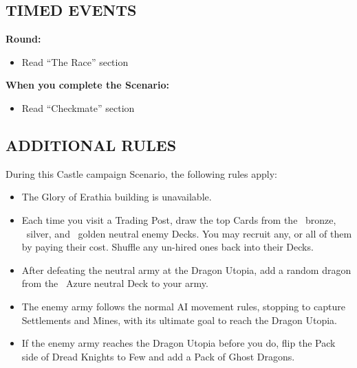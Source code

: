\begin{multicols}{2}

\subsection*{\MakeUppercase{Timed Events}}

\textbf{ Round:}
\begin{itemize}
  \item Read ``The Race'' section
\end{itemize}

\textbf{When you complete the Scenario:}
\begin{itemize}
  \item Read ``Checkmate'' section
\end{itemize}

\subsection*{\MakeUppercase{Additional rules}}

During this Castle campaign Scenario, the following rules apply:

\begin{itemize}
  \item The Glory of Erathia building is unavailable.
  \item Each time you visit a Trading Post, draw the top Cards from the \bronze\ bronze, \silver\ silver, and \golden\ golden neutral enemy Decks.
  You may recruit any, or all of them by paying their cost.
  Shuffle any un-hired ones back into their Decks.

  \item After defeating the neutral army at the Dragon Utopia, add a random dragon from the \azure\ Azure neutral Deck to your army.
  \item The enemy army follows the normal AI movement rules, stopping to capture Settlements and Mines, with its ultimate goal to reach the Dragon Utopia.
  \item If the enemy army reaches the Dragon Utopia before you do, flip the Pack side of Dread Knights to Few and add a Pack of Ghost Dragons.
\end{itemize}

\end{multicols}

